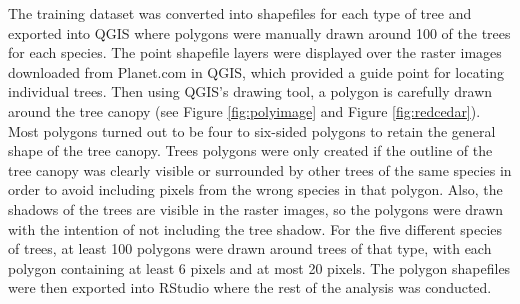 \documentclass[12pt,twoside]{reedthesis}
\begin{document}
The training dataset was converted into shapefiles for each type of tree and exported into QGIS where polygons were manually drawn around 100 of the trees for each species. The point shapefile layers were displayed over the raster images downloaded from Planet.com in QGIS, which provided a guide point for locating individual trees. Then using QGIS's drawing tool, a polygon is carefully drawn around the tree canopy (see Figure \ref{fig:polyimage} and Figure \ref{fig:redcedar}). Most polygons turned out to be four to six-sided polygons to retain the general shape of the tree canopy. Trees polygons were only created if the outline of the tree canopy was clearly visible or surrounded by other trees of the same species in order to avoid including pixels from the wrong species in that polygon. Also, the shadows of the trees are visible in the raster images, so the polygons were drawn with the intention of not including the tree shadow. For the five different species of trees, at least 100 polygons were drawn around trees of that type, with each polygon containing at least 6 pixels and at most 20 pixels. The polygon shapefiles were then exported into RStudio where the rest of the analysis was conducted.
\end{document}
